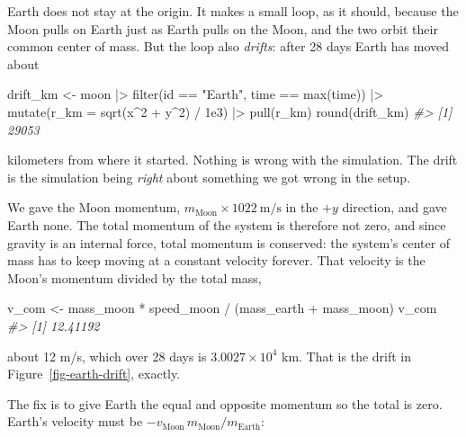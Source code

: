 \documentclass[
  10.5pt,
  letterpaper,
]{scrbook}
\newenvironment{Shaded}{\begin{snugshade}}{\end{snugshade}}
\newcommand{\AttributeTok}[1]{\textcolor[rgb]{0.00,0.00,0.00}{#1}}
\newcommand{\CommentTok}[1]{\textcolor[rgb]{0.00,0.00,0.00}{\textit{#1}}}
\newcommand{\DecValTok}[1]{\textcolor[rgb]{0.00,0.00,0.00}{#1}}
\newcommand{\FloatTok}[1]{\textcolor[rgb]{0.00,0.00,0.00}{#1}}
\newcommand{\FunctionTok}[1]{\textcolor[rgb]{0.00,0.00,0.00}{#1}}
\newcommand{\NormalTok}[1]{\textcolor[rgb]{0.00,0.00,0.00}{#1}}
\newcommand{\OtherTok}[1]{\textcolor[rgb]{0.00,0.00,0.00}{#1}}
\newcommand{\SpecialCharTok}[1]{\textcolor[rgb]{0.00,0.00,0.00}{#1}}
\newcommand{\StringTok}[1]{\textcolor[rgb]{0.00,0.00,0.00}{#1}}
\newcounter{none} %
\theoremstyle{definition}
\theoremstyle{plain}
\theoremstyle{remark}
\begin{document}
Earth does not stay at the origin. It makes a small loop, as it should,
because the Moon pulls on Earth just as Earth pulls on the Moon, and the
two orbit their common center of mass. But the loop also \emph{drifts}:
after 28 days Earth has moved about

\begin{Shaded}
\begin{Highlighting}[]
\NormalTok{drift\_km }\OtherTok{\textless{}{-}}\NormalTok{ moon }\SpecialCharTok{|\textgreater{}}
  \FunctionTok{filter}\NormalTok{(id }\SpecialCharTok{==} \StringTok{"Earth"}\NormalTok{, time }\SpecialCharTok{==} \FunctionTok{max}\NormalTok{(time)) }\SpecialCharTok{|\textgreater{}}
  \FunctionTok{mutate}\NormalTok{(}\AttributeTok{r\_km =} \FunctionTok{sqrt}\NormalTok{(x}\SpecialCharTok{\^{}}\DecValTok{2} \SpecialCharTok{+}\NormalTok{ y}\SpecialCharTok{\^{}}\DecValTok{2}\NormalTok{) }\SpecialCharTok{/} \FloatTok{1e3}\NormalTok{) }\SpecialCharTok{|\textgreater{}}
  \FunctionTok{pull}\NormalTok{(r\_km)}
\FunctionTok{round}\NormalTok{(drift\_km)}
\CommentTok{\#\textgreater{} [1] 29053}
\end{Highlighting}
\end{Shaded}

kilometers from where it started. Nothing is wrong with the simulation.
The drift is the simulation being \emph{right} about something we got
wrong in the setup.

We gave the Moon momentum,
\(m_{\mathrm{Moon}} \times 1022\ \mathrm{m/s}\) in the \(+y\) direction,
and gave Earth none. The total momentum of the system is therefore not
zero, and since gravity is an internal force, total momentum is
conserved: the system's center of mass has to keep moving at a constant
velocity forever. That velocity is the Moon's momentum divided by the
total mass,

\begin{Shaded}
\begin{Highlighting}[]
\NormalTok{v\_com }\OtherTok{\textless{}{-}}\NormalTok{ mass\_moon }\SpecialCharTok{*}\NormalTok{ speed\_moon }\SpecialCharTok{/}\NormalTok{ (mass\_earth }\SpecialCharTok{+}\NormalTok{ mass\_moon)}
\NormalTok{v\_com}
\CommentTok{\#\textgreater{} [1] 12.41192}
\end{Highlighting}
\end{Shaded}

about 12 m/s, which over 28 days is \ensuremath{3.0027\times 10^{4}} km.
That is the drift in Figure~\ref{fig-earth-drift}, exactly.

The fix is to give Earth the equal and opposite momentum so the total is
zero. Earth's velocity must be
\(-v_{\mathrm{Moon}}\, m_{\mathrm{Moon}}/m_{\mathrm{Earth}}\):
\end{document}
